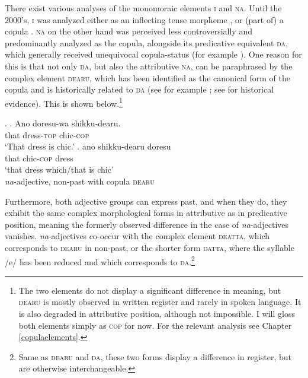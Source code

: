 \documentclass [output=book,colorlinks,citecolor=brown]{langscibook}
\begin{document}
There exist various analyses of the monomoraic elements \textsc{i} and \textsc{na}. Until the 2000’s, \textsc{i} was analyzed either as an inflecting tense morpheme \citep{teramura:1982:nihongo, murasugi:1991:noun, urushibara:1993:syntactic, uehara:1998:syntactic}, or (part of) a copula \citep{kubo:1992:japanese}. \textsc{na} on the other hand was perceived less controversially and predominantly analyzed as the copula, alongside its predicative equivalent \textsc{da}, which generally received unequivocal copula-status (for example \citealt{urushibara:1993:syntactic, nishiyama:1999:adj}). One reason for this is that not only \textsc{da}, but also the attributive \textsc{na}, can be paraphrased by the complex element \textsc{dearu}, which has been identified as the canonical form of the copula and is historically related to \textsc{da} (see for example \citealt{urushibara:1993:syntactic, nishiyama:1999:adj, nakahara:2002:japanese}; see \citealt{miyama:2011:da} for historical evidence). This is shown below.\footnote{The two elements do not display a significant difference in meaning, but \textsc{dearu} is mostly observed in written register and rarely in spoken language. It is also degraded in attributive position, although not impossible. I will gloss both elements simply as \textsc{cop} for now. For the relevant analysis see Chapter \ref{copulaelements}.}

\ex. \ag. Ano doresu-wa shikku-dearu.\\
that dress-\textsc{top} chic-\textsc{cop}\\
`That dress is chic.'
\bg. ano shikku-dearu doresu\\
that chic-\textsc{cop} dress\\
`that dress which/that is chic' \\ \null \hfill \textit{na}-adjective, non-past with copula \textsc{dearu}

Furthermore, both adjective groups can express past, and when they do, they exhibit the same complex morphological forms in attributive as in predicative position, meaning the formerly observed difference in the case of \textit{na}-adjectives vanishes. \textit{na}-adjectives co-occur with the complex element \textsc{deatta}, which corresponds to \textsc{dearu} in non-past, or the shorter form \textsc{datta}, where the syllable /e/ has been reduced and which corresponds to \textsc{da}.\footnote{Same as \textsc{dearu} and \textsc{da}, these two forms display a difference in register, but are otherwise interchangeable.}
\end{document}
